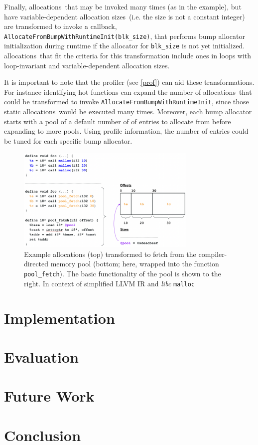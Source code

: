\documentclass{article}
\def\ALLS{allocations}
\def\SIZES{allocation sizes}
\begin{document}
Finally, \ALLS\ that may be invoked many times (as in the example), but have 
variable-dependent \SIZES\ (i.e. the size is not a constant integer) are transformed to 
invoke a callback, \texttt{AllocateFromBumpWithRuntimeInit(blk\_size)}, that performs 
bump allocator initialization during runtime if the allocator for \texttt{blk\_size} is not
yet initialized. \ALLS\ that fit the criteria for this transformation include ones
in loops with loop-invariant and variable-dependent \SIZES .

It is important to note that the profiler (see \ref{prof}) can aid these transformations.
For instance identifying hot functions can expand the number of \ALLS\ that could
be transformed to invoke \texttt{AllocateFromBumpWithRuntimeInit}, since those static
\ALLS\ would be executed many times. Moreover, each bump allocator starts with a pool of 
a default number of of entries to allocate from before expanding to more pools. Using
profile information, the number of entries could be tuned for each specific bump allocator.

\begin{figure}
    \centering
    \begin{minipage}{0.45\textwidth}
        \centering
        \includegraphics[width=0.77\textwidth]{figs/pool.png} 
        \caption{Example allocations (top) transformed to fetch from the compiler-directed
        memory pool (bottom; here, wrapped into the function \texttt{pool\_fetch}). The 
        basic functionality of the pool is shown to the right. In context of simplified LLVM 
        IR and \textit{libc} \texttt{malloc}}  
	    \label{fig:pool}
    \end{minipage}\hfill
\end{figure}




\section{Implementation}

\section{Evaluation}

\section{Future Work}

\section{Conclusion}



\end{document}

